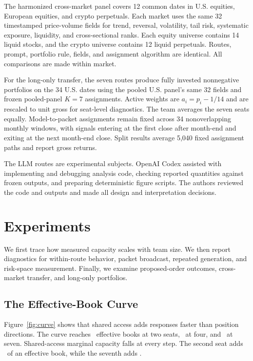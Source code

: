 \documentclass[sigconf]{acmart}
\begin{document}
The harmonized cross-market panel covers 12 common dates in U.S. equities, European equities, and crypto perpetuals. Each market uses the same 32 timestamped price-volume fields for trend, reversal, volatility, tail risk, systematic exposure, liquidity, and cross-sectional ranks. Each equity universe contains 14 liquid stocks, and the crypto universe contains 12 liquid perpetuals. Routes, prompt, portfolio rule, fields, and assignment algorithm are identical. All comparisons are made within market.

For the long-only transfer, the seven routes produce fully invested nonnegative portfolios on the 34 U.S. dates using the pooled U.S. panel's same 32 fields and frozen pooled-panel $K=7$ assignments. Active weights are $a_i=p_i-1/14$ and are rescaled to unit gross for seat-level diagnostics. The team averages the seven seats equally. Model-to-packet assignments remain fixed across 34 nonoverlapping monthly windows, with signals entering at the first close after month-end and exiting at the next month-end close. Split results average 5,040 fixed assignment paths and report gross returns.

The LLM routes are experimental subjects. OpenAI Codex assisted with implementing and debugging analysis code, checking reported quantities against frozen outputs, and preparing deterministic figure scripts. The authors reviewed the code and outputs and made all design and interpretation decisions.

\section{Experiments}\label{sec:experiments}
We first trace how measured capacity scales with team size. We then report diagnostics for within-route behavior, packet broadcast, repeated generation, and risk-space measurement. Finally, we examine proposed-order outcomes, cross-market transfer, and long-only portfolios.

\subsection{The Effective-Book Curve}
Figure~\ref{fig:curve} shows that shared access adds responses faster than position directions. The curve reaches \SharedKTwo\ effective books at two seats, \SharedKFour\ at four, and \SharedKSeven\ at seven. Shared-access marginal capacity falls at every step. The second seat adds \SharedFirstMarginal\ of an effective book, while the seventh adds \SharedLastMarginal.
\end{document}
